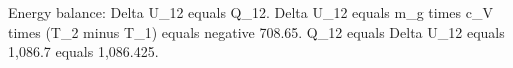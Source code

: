 Energy balance: Delta U_12 equals Q_12.  
Delta U_12 equals m_g times c_V times (T_2 minus T_1) equals negative 708.65.  
Q_12 equals Delta U_12 equals 1,086.7 equals 1,086.425.